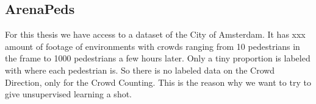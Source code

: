 \subsection{ArenaPeds}
For this thesis we have access to a dataset of the City of Amsterdam. It has xxx amount of footage of environments with crowds ranging from 10 pedestrians in the frame to 1000 pedestrians a few hours later. Only a tiny proportion is labeled with where each pedestrian is. So there is no labeled data on the Crowd Direction, only for the Crowd Counting. This is the reason why we want to try to give unsupervised learning a shot.

